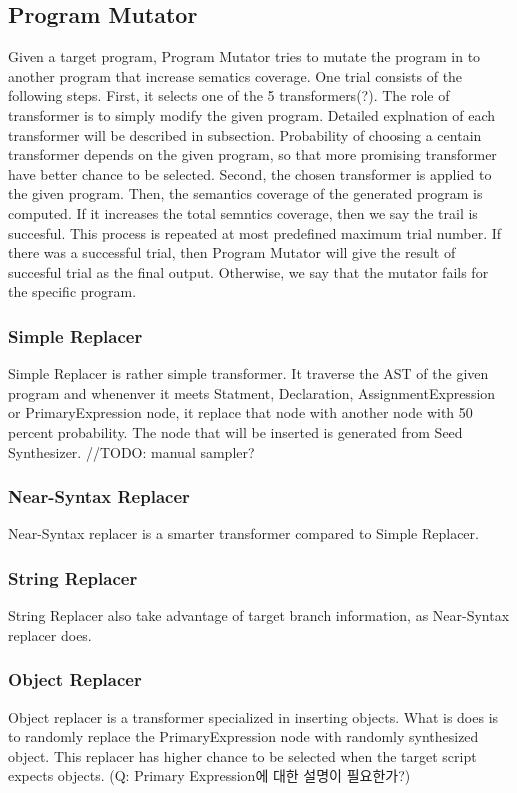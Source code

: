 \subsection{Program Mutator}

Given a target program, \textsf{Program Mutator} tries to mutate the program
in to another program that increase sematics coverage.  One trial consists of
the following steps.
First, it selects one of the 5 transformers(?). The role
of transformer is to simply modify the given program. Detailed explnation of each
transformer will be described in subsection.  Probability of choosing a centain
transformer depends on the given program, so that more promising transformer have
better chance to be selected.
Second, the chosen transformer is applied to the given program.  Then, the semantics
coverage of the generated program is computed.  If it increases the total semntics
coverage, then we say the trail is succesful.
This process is repeated at most predefined maximum trial number.  If there was a successful
trial, then \textsf{Program Mutator} will give the result of succesful trial as the final output.
Otherwise, we say that the mutator fails for the specific program.

\subsubsection{Simple Replacer}
Simple Replacer is rather simple transformer.  It traverse the AST of the given program
and whenenver it meets Statment, Declaration, AssignmentExpression or PrimaryExpression node,
it replace that node with another node with 50 percent probability.  The node that will be inserted
is generated from \textsf{Seed Synthesizer}.  //TODO: manual sampler?

\subsubsection{Near-Syntax Replacer}
Near-Syntax replacer is a smarter transformer compared to Simple Replacer.

\subsubsection{String Replacer}
String Replacer also take advantage of target branch information, as Near-Syntax replacer does.

\subsubsection{Object Replacer}
Object replacer is a transformer specialized in inserting objects.  What is does is to 
randomly replace the PrimaryExpression node with randomly synthesized object.
This replacer has higher chance to be selected when the target script expects
objects.
(Q: Primary Expression에 대한 설명이 필요한가?)

